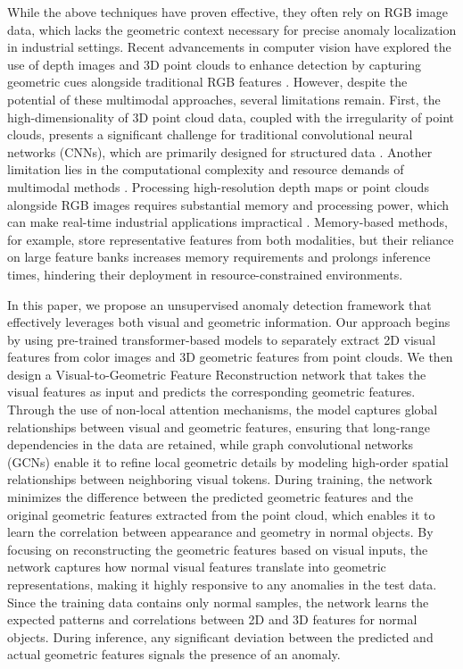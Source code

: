 While the above techniques have proven effective, they often rely on RGB image data, which lacks the geometric context necessary for precise anomaly localization in industrial settings. Recent advancements in computer vision have explored the use of depth images and 3D point clouds to enhance detection by capturing geometric cues alongside traditional RGB features \cite{bergmann2023anomaly, rudolph2023asymmetric, horwitz2023back, wang2023multimodal}. However, despite the potential of these multimodal approaches, several limitations remain. First, the high-dimensionality of 3D point cloud data, coupled with the irregularity of point clouds, presents a significant challenge for traditional convolutional neural networks (CNNs), which are primarily designed for structured data \DIFaddbegin {}\DIFaddend . Another limitation lies in the computational complexity and resource demands of multimodal methods \DIFaddbegin {}\DIFaddend . Processing high-resolution depth maps or point clouds alongside RGB images requires substantial memory and processing power, which can make real-time industrial applications impractical \DIFaddbegin {}\DIFaddend . Memory-based methods, for example, store representative features from both modalities, but their reliance on large feature banks increases memory requirements and prolongs inference times, hindering their deployment in resource-constrained environments.

In this paper,  we propose an unsupervised anomaly detection framework that effectively leverages both visual and geometric information. Our approach begins by using pre-trained transformer-based models to separately extract 2D visual features from color images and 3D geometric features from point clouds. We then design a Visual-to-Geometric Feature Reconstruction network that takes the visual features as input and predicts the corresponding geometric features. Through the use of non-local attention mechanisms, the model captures global relationships between visual and geometric features, ensuring that long-range dependencies in the data are retained, while graph convolutional networks (GCNs) enable it to refine local geometric details by modeling high-order spatial relationships between neighboring visual tokens. During training, the network minimizes the difference between the predicted geometric features and the original geometric features extracted from the point cloud, which enables it to learn the correlation between appearance and geometry in normal objects. By focusing on reconstructing the geometric features based on visual inputs, the network captures how normal visual features translate into geometric representations, making it highly responsive to any anomalies in the test data. Since the training data contains only normal samples, the network learns the expected patterns and correlations between 2D and 3D features for normal objects. During inference, any significant deviation between the predicted and actual geometric features signals the presence of an anomaly.

